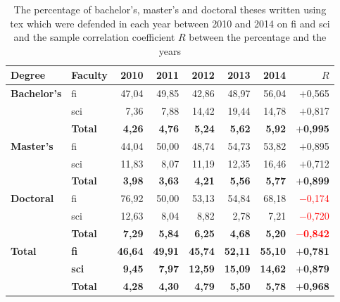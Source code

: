   \begin{table}
      \begin{tabularx}{\textwidth}{Xlrrrrrr}
      \textbf{Degree} & \textbf{Faculty} & \textbf{2010} & \textbf{2011} & \textbf{2012} & \textbf{2013} & \textbf{2014} & $R$\\
      \hline
      \textbf{Bachelor's}
        & \acrshort{fi}  & 47,04 & 49,85 & 42,86 & 48,97 & 56,04 & \textcolor{OliveGreen}{$+$0,565} \\
        & \acrshort{sci} &  7,36 &  7,88 & 14,42 & 19,44 & 14,78 & \textcolor{OliveGreen}{$+$0,817} \\
        & \textbf{Total} & \textbf{4,26} & \textbf{4,76} & \textbf{5,24} & \textbf{5,62} & \textbf{5,92} & \textbf{\textcolor{OliveGreen}{$+$0,995}} \\
      \textbf{Master's}
        & \acrshort{fi}  & 44,04 & 50,00 & 48,74 & 54,73 & 53,82 & \textcolor{OliveGreen}{$+$0,895} \\
        & \acrshort{sci} & 11,83 &  8,07 & 11,19 & 12,35 & 16,46 & \textcolor{OliveGreen}{$+$0,712} \\
        & \textbf{Total} & \textbf{3,98} & \textbf{3,63} & \textbf{4,21} & \textbf{5,56} & \textbf{5,77} &  \textbf{\textcolor{OliveGreen}{$+$0,899}} \\
      \textbf{Doctoral}
        & \acrshort{fi}  & 76,92 & 50,00 & 53,13 & 54,84 & 68,18 & \textcolor{red}{$-$0,174} \\
        & \acrshort{sci} & 12,63 &  8,04 &  8,82 &  2,78 &  7,21 & \textcolor{red}{$-$0,720} \\
        & \textbf{Total} & \textbf{7,29} & \textbf{5,84} & \textbf{6,25} & \textbf{4,68} & \textbf{5,20} & \textcolor{red}{\textbf{$-$0,842}} \\
      \hline
      \textbf{Total} 
        & \textbf{\acrshort{fi} } & \textbf{46,64} & \textbf{49,91} & \textbf{45,74} & \textbf{52,11} & \textbf{55,10} & \textbf{\textcolor{OliveGreen}{$+$0,781}} \\
        & \textbf{\acrshort{sci}} & \textbf{9,45} &  \textbf{7,97} & \textbf{12,59} & \textbf{15,09} & \textbf{14,62} & \textbf{\textcolor{OliveGreen}{$+$0,879}} \\
        & \textbf{Total} &\textbf{4,28} & \textbf{4,30} & \textbf{4,79} & \textbf{5,50} & \textbf{5,78} & \textbf{\textcolor{OliveGreen}{$+$0,968}}
    \end{tabularx}
    \caption{The percentage of bachelor's, master's and doctoral theses written using \gls{tex} which were defended in each year between 2010 and 2014 on \acrshort{fi} and \acrshort{sci} and the sample correlation coefficient $R$ between the percentage and the years}
    \label{table:statistics-tex-yearly}
  \end{table}
  
